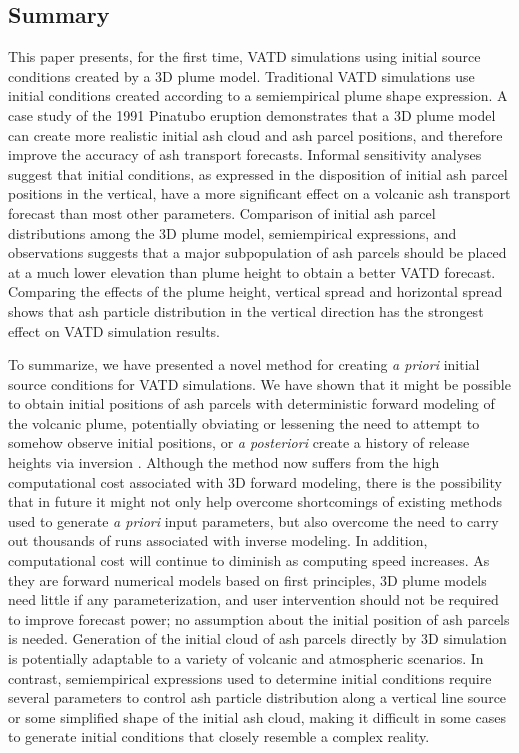 \documentclass[utf8]{frontiersSCNS} %
\begin{document}
\subsection{Summary}
This paper presents, for the first time, VATD simulations using initial source conditions created by a 3D plume model. Traditional VATD simulations use initial conditions created according to a semiempirical plume shape expression. A case study of the 1991 Pinatubo eruption demonstrates that a 3D plume model can create more realistic initial ash cloud and ash parcel positions, and therefore improve the accuracy of ash transport forecasts. Informal sensitivity analyses suggest that initial conditions, as expressed in the disposition of initial ash parcel positions in the vertical, have a more significant effect on a volcanic ash transport forecast than most other parameters. Comparison of initial ash parcel distributions among the 3D plume model, semiempirical expressions, and observations suggests that a major subpopulation of ash parcels should be placed at a much lower elevation than plume height to obtain a better VATD forecast. Comparing the effects of the plume height, vertical spread and horizontal spread shows that ash particle distribution in the vertical direction has the strongest effect on VATD simulation results.

To summarize, we have presented a novel method for creating \textit{a priori} initial source conditions for VATD simulations. We have shown that it might be possible to obtain initial positions of ash parcels with deterministic forward modeling of the volcanic plume, potentially obviating or lessening the need to attempt to somehow observe initial positions, or \textit{a posteriori} create a history of release heights via inversion \citep{stohl2011determination}. Although the method now suffers from the high computational cost associated with 3D forward modeling, there is the possibility that in future it might not only help overcome shortcomings of existing methods used to generate \textit{a priori} input parameters, but also overcome the need to carry out thousands of runs associated with inverse modeling. In addition, computational cost will continue to diminish as computing speed increases. As they are forward numerical models based on first principles, 3D plume models need little if any parameterization, and user intervention should not be required to improve forecast power; no assumption about the initial position of ash parcels is needed. Generation of the initial cloud of ash parcels directly by 3D simulation is potentially adaptable to a variety of volcanic and atmospheric scenarios. In contrast, semiempirical expressions used to determine initial conditions require several parameters to control ash particle distribution along a vertical line source or some simplified shape of the initial ash cloud, making it difficult in some cases to generate initial conditions that closely resemble a complex reality.
\end{document}
